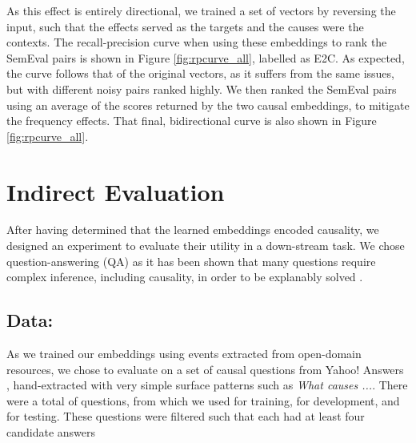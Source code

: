 As this effect is entirely directional, we trained a set of vectors by reversing the input, such that the effects served as the targets and the causes were the contexts.  The recall-precision curve when using these embeddings to rank the SemEval pairs is shown in Figure \ref{fig:rpcurve_all}, labelled as E2C.  As expected, the curve follows that of the original vectors, as it suffers from the same issues, but with different noisy pairs ranked highly.  We then ranked the SemEval pairs using an average of the scores returned by the two causal embeddings, to mitigate the frequency effects.  That final, bidirectional curve is also shown in Figure \ref{fig:rpcurve_all}.

\section{Indirect Evaluation}
\label{sec-emnlp2016:indirecteval}

After having determined that the learned embeddings encoded causality, we designed an experiment to evaluate their utility in a down-stream task.  We chose question-answering (QA) as it has been shown that many questions require complex inference, including causality, in order to be explanably solved .  

\subsection{Data:}
As we trained our embeddings using events extracted from open-domain resources, we chose to evaluate on a set of causal questions from Yahoo! Answers , hand-extracted with very simple surface patterns such as \emph{What causes ...}.  There were a total of  questions, from which we used  for training,  for development, and  for testing.
These questions were filtered such that each had at least four candidate answers


